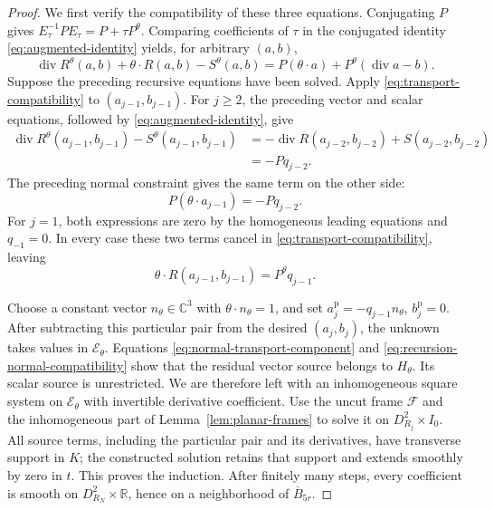 \documentclass[11pt]{article}
\newcommand{\R}{\mathbb R}
\newcommand{\C}{\mathbb C}
\DeclareMathOperator{\diverg}{div}
\newcommand{\Ecal}{\mathcal E}
\theoremstyle{remark}
\numberwithin{equation}{section}
\begin{document}
\begin{proof}
We first verify the compatibility of these three equations.
Conjugating $P$ gives $E_\tau^{-1}PE_\tau=P+\tau P^\theta$.
Comparing coefficients of $\tau$ in the conjugated identity
\eqref{eq:augmented-identity} yields, for arbitrary $(a,b)$,
\begin{equation}
\label{eq:transport-compatibility}
 \diverg R^\theta(a,b)+\theta\cdot R(a,b)-S^\theta(a,b)
 =P(\theta\cdot a)+P^\theta(\diverg a-b).
\end{equation}
Suppose the preceding recursive equations have been solved.
Apply \eqref{eq:transport-compatibility} to $(a_{j-1},b_{j-1})$.
For $j\ge2$, the preceding vector and scalar equations, followed by
\eqref{eq:augmented-identity}, give
\[
 \begin{aligned}
 \diverg R^\theta(a_{j-1},b_{j-1})
       -S^\theta(a_{j-1},b_{j-1})
   &=-\diverg R(a_{j-2},b_{j-2})+S(a_{j-2},b_{j-2})\\
   &=-Pq_{j-2}.
 \end{aligned}
\]
The preceding normal constraint gives the same term on the other side:
\[
 P(\theta\cdot a_{j-1})=-Pq_{j-2}.
\]
For $j=1$, both expressions are zero by the homogeneous leading
equations and $q_{-1}=0$. In every case these two terms cancel in
\eqref{eq:transport-compatibility}, leaving
\begin{equation}
\label{eq:recursion-normal-compatibility}
 \theta\cdot R(a_{j-1},b_{j-1})=P^\theta q_{j-1}.
\end{equation}

Choose a constant vector $n_\theta\in\C^3$ with
$\theta\cdot n_\theta=1$, and set
$a_j^{\mathrm p}=-q_{j-1}n_\theta$, $b_j^{\mathrm p}=0$.
After subtracting this particular pair from the desired
$(a_j,b_j)$, the unknown takes values in $\Ecal_\theta$.
Equations \eqref{eq:normal-transport-component} and
\eqref{eq:recursion-normal-compatibility} show that the residual
vector source belongs to $H_\theta$. Its scalar source is
unrestricted. We are therefore left with an inhomogeneous
square system on $\Ecal_\theta$ with invertible derivative
coefficient. Use the uncut frame $\mathcal F$ and the
inhomogeneous part of Lemma~\ref{lem:planar-frames} to solve it
on $D_{R_j}^2\times I_0$. All source terms, including the
particular pair and its derivatives, have transverse support
in $K$; the constructed solution retains that support and
extends smoothly by zero in $t$. This proves the induction.
After finitely many steps, every coefficient is smooth on
$D_{R_N}^2\times\R$, hence on a neighborhood of
$\overline B_{5r}$.


\end{proof}
\end{document}
